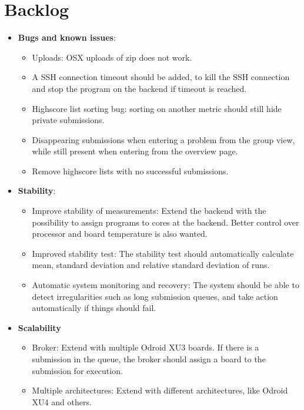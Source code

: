 \chapter{Backlog}
\label{apdx:backlog}

\begin{itemize}
\item \textbf{Bugs and known issues}:
    \begin{itemize}
        \item Uploads: OSX uploads of zip does not work.
        \item A SSH connection timeout should be added, to kill the SSH connection and stop the program on the backend if timeout is reached.
        \item Highscore list sorting bug: sorting on another metric should still hide private submissions.
        \item Disappearing submissions when entering a problem from the group view, while still present when entering from the overview page.
        \item Remove highscore lists with no successful submissions.
    \end{itemize}
\item \textbf{Stability}:
    \begin{itemize}
        \item Improve stability of measurements: Extend the backend with the possibility to assign programs to cores at the backend. Better control over processor and board temperature is also wanted.
        \item Improved stability test: The stability test should automatically calculate mean, standard deviation and relative standard deviation of runs.
        \item Automatic system monitoring and recovery: The system should be able to detect irregularities such as long submission queues, and take action automatically if things should fail.
    \end{itemize}
\item \textbf{Scalability}
    \begin{itemize}
        \item Broker: Extend with multiple Odroid XU3 boards. If there is a submission in the queue, the broker should assign a board to the submission for execution.
        \item Multiple architectures: Extend with different architectures, like Odroid XU4 and others.
    \end{itemize}

\end{itemize}
